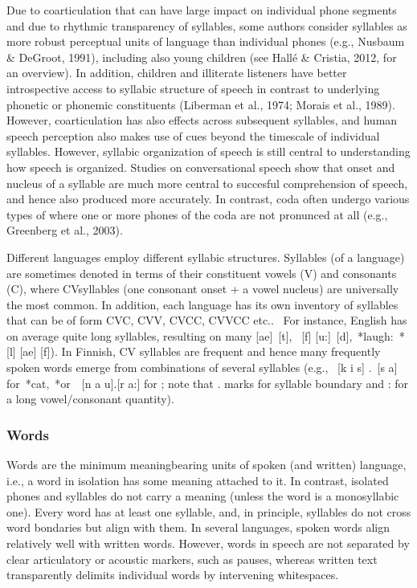 \documentclass[letterpaper,10pt,english]{jupyterBook}
\begin{document}
\sphinxAtStartPar
Due to coarticulation that can have large impact on individual phone
segments and due to rhythmic transparency of syllables, some authors
consider syllables as more robust perceptual units of language than
individual phones (e.g., Nusbaum \& DeGroot, 1991), including also young
children (see Hallé \& Cristia, 2012, for an overview). In addition,
children and illiterate listeners have better introspective access to
syllabic structure of speech in contrast to underlying phonetic or
phonemic constituents (Liberman et al., 1974; Morais et al., 1989).
However, coarticulation has also effects across subsequent syllables,
and human speech perception also makes use of cues beyond the time\sphinxhyphen{}scale
of individual syllables. However, syllabic organization of speech is
still central to understanding how speech is organized. Studies on
conversational speech show that onset and nucleus of a syllable are much
more central to succesful comprehension of speech, and hence also
produced more accurately. In contrast, coda often undergo various types
of  where one or more phones of the coda are not
pronunced at all (e.g., Greenberg et al., 2003).

\sphinxAtStartPar
Different languages employ different syllabic structures. Syllables (of
a language) are sometimes denoted in terms of their constituent vowels
(V) and consonants (C), where CV\sphinxhyphen{}syllables (one consonant onset + a
vowel nucleus) are universally the most common. In addition, each
language has its own inventory of syllables that can be of form CVC,
CVV, CVCC, CVVCC etc..  For instance, English has on average quite long
syllables, resulting on many 
{[}ae{]} {[}t{]},  {[}f{]} {[}u:{]} {[}d{]}, *laugh: *{[}l{]} {[}ae{]} {[}f{]}).
In Finnish, CV syllables are frequent and hence many frequently spoken
words emerge from combinations of several syllables (e.g.,  {[}k
i s{]} . {[}s a{]} for *cat, *or  {[}n a u{]}.{[}r a:{]} for 
; note that . marks for syllable boundary and : for a long
vowel/consonant quantity).


\subsubsection{Words}
\label{\detokenize{Introduction/Linguistic_structure_of_speech:words}}
\sphinxAtStartPar
Words are the minimum meaning\sphinxhyphen{}bearing units of spoken (and written)
language, i.e., a word in isolation has some meaning attached to it. In
contrast, isolated phones and syllables do not carry a meaning (unless
the word is a monosyllabic one). Every word has at least one syllable,
and, in principle, syllables do not cross word bondaries but align with
them. In several languages, spoken words align relatively well with
written words. However, words in speech are not separated by clear
articulatory or acoustic markers, such as pauses, whereas written text
transparently delimits individual words by intervening whitespaces.
\end{document}
